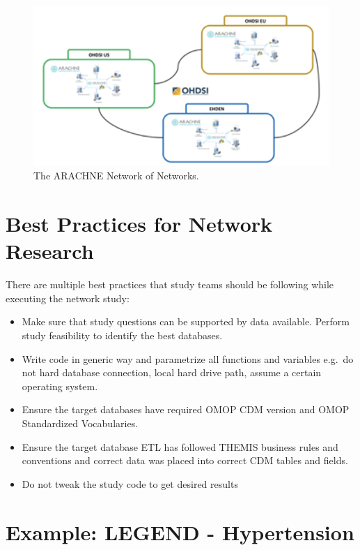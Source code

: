 \documentclass[11pt]{book}
\providecommand{\tightlist}{%
  \setlength{\itemsep}{0pt}\setlength{\parskip}{0pt}}
\theoremstyle{definition}
\theoremstyle{definition}
\theoremstyle{definition}
\theoremstyle{remark}
\begin{document}
\begin{figure}
\includegraphics[width=1\linewidth]{images/NetworkStudies/ARACHNENON} \caption{The ARACHNE Network of Networks.}\label{fig:arachneNon}
\end{figure}

\hypertarget{best-practices-for-network-research}{%
\section{Best Practices for Network Research}\label{best-practices-for-network-research}}

There are multiple best practices that study teams should be following while executing the network study:

\begin{itemize}
\tightlist
\item
  Make sure that study questions can be supported by data available. Perform study feasibility to identify the best databases.
\item
  Write code in generic way and parametrize all functions and variables e.g.~do not hard database connection, local hard drive path, assume a certain operating system.
\item
  Ensure the target databases have required OMOP CDM version and OMOP Standardized Vocabularies.
\item
  Ensure the target database ETL has followed THEMIS business rules and conventions and correct data was placed into correct CDM tables and fields.
\item
  Do not tweak the study code to get desired results
\end{itemize}

\hypertarget{example-legend---hypertension}{%
\section{Example: LEGEND - Hypertension}\label{example-legend---hypertension}}
\end{document}
